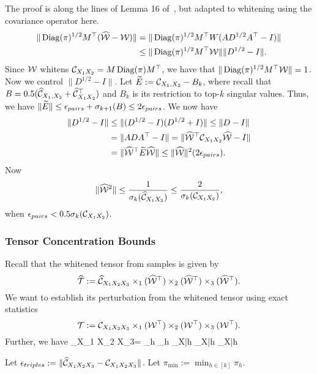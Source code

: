 \bprf The proof is along the lines of Lemma 16 of~\cite{AnandkumarEtal:community12}, but adapted to whitening using the covariance operator here.
 \begin{align*}\|\operatorname{Diag}(\pi)^{1/2} M^\top(\widehat{\mathcal{W}}-\mathcal{W})\|&=
\|\operatorname{Diag}(\pi)^{1/2} M^\top W(A D^{1/2} A^\top -I)\|\\ &\leq\|\operatorname{Diag}(\pi)^{1/2} M^\top \mathcal{W}\| \|D^{1/2}-I\|. \end{align*} Since $\mathcal{W}$ whitens $\Ccal_{X_1 X_2}=M \Diag(\pi) M^\top\iffalse+E\fi$, we have that $\|\operatorname{Diag}(\pi)^{1/2} M^\top \mathcal{W}\| =1$\iffalse\leq \|I-E\|^{1/2}\leq 1+ \sigma_{k+1}(\Ccal_{X_1 X_2})\fi. Now we control $\|D^{1/2}-I\|$.  Let $\widetilde{E}:= \mathcal{C}_{X_1,X_{2}} -B_k$, where recall that $B=0.5( \widehat {\mathcal{C}}_{X_1,X_{2}}+ \widehat{\mathcal{C}}_{X_1 X_2}^\top)$ and $B_k$ is its restriction to top-$k$ singular values. Thus, we have $\|\tl{E}\| \leq \epsilon_{pairs} + \sigma_{k+1}(B)\leq 2\epsilon_{pairs}\iffalse+\sigma_{k+1}(\Ccal_{X_1 X_2})\fi$.
 We now have
\begin{align*}
\|D^{1/2}-I\|&\leq \|(D^{1/2}-I)(D^{1/2}+I)\|\leq \|D-I\|
\\ &=\|AD A^\top - I\| = \|\h{\Wcal}^\top \Ccal_{X_1 X_2}  \h{\Wcal} -I\|\\ &=\| \h{\Wcal}^\top  \tl{E} \h{\Wcal}\| \leq \|\h{\Wcal}\|^2 ( 2 \epsilon_{pairs}\iffalse+\sigma_{k+1}(\Ccal_{X_1 X_2})\fi).
\end{align*}Now
\[ \|\widehat{\mathcal{W}}^2\| \leq\frac{1}{ \sigma_k(\widehat{\mathcal{C}}_{X_1 X_2})}\leq \frac{2}{\sigma_k(\mathcal{C}_{X_1 X_2})},\] when  $\epsilon_{pairs}<0.5 \sigma_k(\mathcal{C}_{X_1 X_2})$.
\eprf

\subsubsection{Tensor Concentration Bounds}

Recall that the whitened tensor from samples is given by
$$\widehat{{\mathcal{T}}} := \widehat{\mathcal{C}}_{X_1 X_2 X_3} \times_1 (\widehat{\mathcal{W}}^\top) \times_2 (\widehat{\mathcal{W}}^\top) \times_3 (\widehat{\mathcal{W}}^\top).$$ We want to establish its perturbation from the whitened tensor using exact statistics
$${\mathcal{T}} := \mathcal{C}_{X_1 X_2 X_3} \times_1 (\mathcal{W}^\top ) \times_2 (\mathcal{W}^\top ) \times_3 (\mathcal{W}^\top ).$$ Further, we have
\beq\label{eqn:triplesexpression}\Ccal_{X_1 X_2 X_3}= \sum_{h\in [k]} \pi_h \cdot \mu_{X|h} \otimes \mu_{X|h} \otimes \mu_{X|h} \iffalse+ E_{X_1, X_2, X_3}\fi\eeq

Let $\epsilon_{triples}:= \|\widehat{\mathcal{C}}_{X_1 X_2 X_3}-\mathcal{C}_{X_1 X_2 X_3}\|_{}$. Let $\pi_{\min}:=\min_{h\in [k]}\pi_h$.

